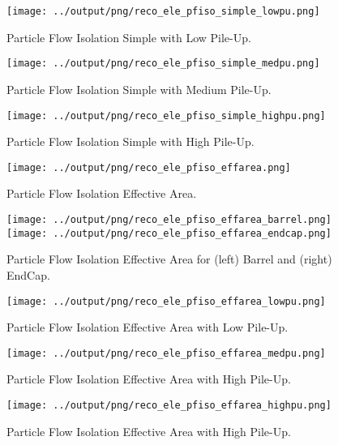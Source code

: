 \documentclass[11pt]{book}
\begin{document}
\begin{figure}[ht]
\centering
\texttt{[image: ../output/png/reco\_ele\_pfiso\_simple\_lowpu.png]}
\caption{Particle Flow Isolation Simple with Low Pile-Up.}
\label{fig:reco_ele_pfiso_simple_lowpu}
\end{figure}

\begin{figure}[ht]
\centering
\texttt{[image: ../output/png/reco\_ele\_pfiso\_simple\_medpu.png]}
\caption{Particle Flow Isolation Simple with Medium Pile-Up.}
\label{fig:reco_ele_pfiso_simple_medpu}
\end{figure}

\begin{figure}[ht]
\centering
\texttt{[image: ../output/png/reco\_ele\_pfiso\_simple\_highpu.png]}
\caption{Particle Flow Isolation Simple with High Pile-Up.}
\label{fig:reco_ele_pfiso_simple_highpu}
\end{figure}

\begin{figure}[ht]
\centering
\texttt{[image: ../output/png/reco\_ele\_pfiso\_effarea.png]}
\caption{Particle Flow Isolation Effective Area.}
\label{fig:reco_ele_pfiso_effarea}
\end{figure}

\begin{figure}[ht]
\centering
\texttt{[image: ../output/png/reco\_ele\_pfiso\_effarea\_barrel.png]}
\texttt{[image: ../output/png/reco\_ele\_pfiso\_effarea\_endcap.png]}
\caption{Particle Flow Isolation Effective Area for (left) Barrel and (right) EndCap.}
\label{fig:reco_ele_pfiso_effarea_regions}
\end{figure}

\begin{figure}[ht]
\centering
\texttt{[image: ../output/png/reco\_ele\_pfiso\_effarea\_lowpu.png]}
\caption{Particle Flow Isolation Effective Area with Low Pile-Up.}
\label{fig:reco_ele_pfiso_effarea_lowpu}
\end{figure}

\begin{figure}[ht]
\centering
\texttt{[image: ../output/png/reco\_ele\_pfiso\_effarea\_medpu.png]}
\caption{Particle Flow Isolation Effective Area with High Pile-Up.}
\label{fig:reco_ele_pfiso_effarea_medpu}
\end{figure}

\begin{figure}[ht]
\centering
\texttt{[image: ../output/png/reco\_ele\_pfiso\_effarea\_highpu.png]}
\caption{Particle Flow Isolation Effective Area with High Pile-Up.}
\label{fig:reco_ele_pfiso_effarea_highpu}
\end{figure}
\end{document}
